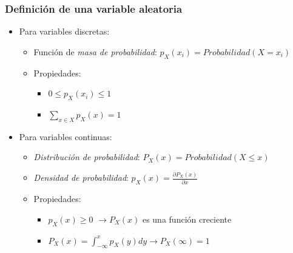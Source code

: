 \begin{frame}\frametitle{Definición de una variable aleatoria}
  \begin{itemize}
    \item \alert{Para variables discretas:}
    \vspace{0.1cm}
    \begin{itemize}\footnotesize
      \item Función de \color{olivegreen}\emph{masa de probabilidad}: \color{blue}$p_X(x_i)=Probabilidad(X=x_i)$\color{black}
      \vspace{0.1cm}
      \item Propiedades:
      \begin{itemize}
        \item $0\le p_X(x_i)\le 1$
        \vspace{0.1cm}
        \item $\sum_{x\in X} p_X(x)=1$
      \end{itemize}
    \end{itemize}
    \vspace{0.2cm}
    \item \alert{Para variables continuas:}
    \vspace{0.1cm}
    \begin{itemize}\footnotesize
      \item \color{olivegreen}\emph{Distribución de probabilidad}: \color{blue}$P_X(x)=Probabilidad(X\le x)$\color{black}
      \vspace{0.1cm}
      \item \color{olivegreen}\emph{Densidad de probabilidad}: \color{blue}$p_X(x)=\frac{\partial P_X(x)}{\partial x}$\color{black}
      \vspace{0.1cm}
      \item Propiedades:
      \begin{itemize}
        \item $p_X(x)\ge 0$ $\rightarrow P_X(x)$ es una función creciente
        \vspace{0.1cm}
        \item $P_X(x)=\int_{-\infty}^x p_X(y)dy \rightarrow P_X(\infty)=1$
      \end{itemize}
    \end{itemize}
  \end{itemize}




\end{frame}

